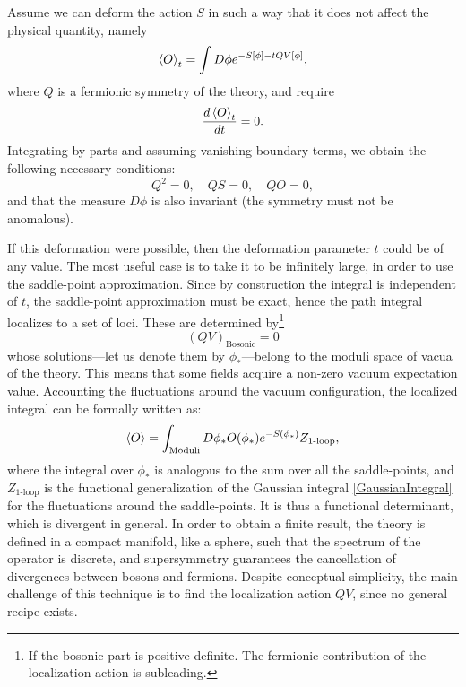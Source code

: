 Assume we can deform the action $S$ in such a way that it does not affect the physical quantity, 
namely
\begin{equation}
 \braket{O}_t = \int D\phi e^{-S[\phi]-t Q V[\phi]}, 
\end{equation}
where 
$Q$ is a fermionic symmetry of the theory, and require
\begin{equation}
 \dfrac{d \braket{O}_t}{d t} = 0.
\end{equation}
Integrating by parts and assuming vanishing boundary terms, 
we obtain the following necessary conditions:
\begin{equation}\label{loc:susyCondition}
 Q^2 = 0, \quad Q S = 0, \quad Q O = 0,
\end{equation}
and that the measure $D\phi$ is also invariant (the symmetry must not be anomalous).

If this deformation were possible, then the deformation parameter $t$ could be of any value. 
The most useful case is to take it to be infinitely large,
in order to use the saddle-point approximation.
Since by construction the integral is independent of $t$, the saddle-point approximation must be exact,
hence the path integral localizes to a set of loci.
These are determined by\footnote{ 
If the bosonic part is positive-definite.
The fermionic contribution of the localization action is subleading.}
\begin{equation}\label{loc:saddlePoint}
 (QV)_\text{Bosonic} = 0
\end{equation}
whose solutions---let us denote them by $\phi_*$---belong to the moduli space of vacua of the theory.
This means that some fields acquire a non-zero vacuum expectation value.
Accounting the fluctuations around the vacuum configuration,
the localized integral can be formally written as:
\begin{equation}
 \braket{O}=\int_\text{Moduli} D\phi_* O(\phi_*) e^{-S(\phi_*)} Z_\text{1-loop},
\end{equation}
where the integral over $\phi_*$ is analogous to the sum over all the saddle-points, 
and $Z_\text{1-loop}$  is the functional generalization of the Gaussian integral \eqref{GaussianIntegral} for the fluctuations around the saddle-points. 
It is thus a functional determinant, which is divergent in general.
In order to obtain a finite result, the theory is defined in a compact manifold, like a sphere, 
such that the spectrum of the operator is discrete, and supersymmetry guarantees the cancellation of divergences between bosons and fermions.
Despite conceptual simplicity, the main challenge of this technique is to find the localization action $QV$, since no general recipe exists. 



